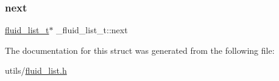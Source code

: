 \mbox{\label{struct__fluid__list__t_a60f4bba688688d1ceabba258a96d3625}} 
\subsubsection{\texorpdfstring{next}{next}}
{\footnotesize\ttfamily \hyperlink{fluid__list_8h_a3ef7535d4290862c0af118569223bd89}{fluid\+\_\+list\+\_\+t}$\ast$ \+\_\+fluid\+\_\+list\+\_\+t\+::next}



The documentation for this struct was generated from the following file\+:\begin{DoxyCompactItemize}
\item 
utils/\hyperlink{fluid__list_8h}{fluid\+\_\+list.\+h}\end{DoxyCompactItemize}
